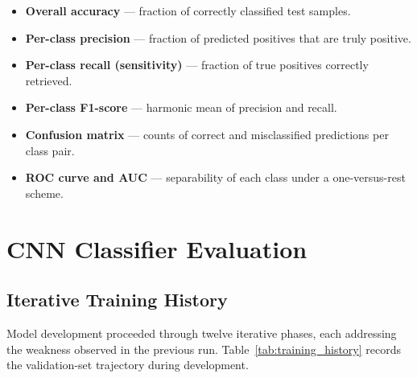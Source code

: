 \begin{itemize}
    \item \textbf{Overall accuracy} — fraction of correctly classified test samples.
    \item \textbf{Per-class precision} — fraction of predicted positives that are truly positive.
    \item \textbf{Per-class recall (sensitivity)} — fraction of true positives correctly retrieved.
    \item \textbf{Per-class F1-score} — harmonic mean of precision and recall.
    \item \textbf{Confusion matrix} — counts of correct and misclassified predictions per class pair.
    \item \textbf{ROC curve and AUC} — separability of each class under a one-versus-rest scheme.
\end{itemize}

\section{CNN Classifier Evaluation}
\label{sec:cnn}

\subsection{Iterative Training History}

Model development proceeded through twelve iterative phases, each addressing the
weakness observed in the previous run. Table~\ref{tab:training_history} records
the validation-set trajectory during development.

